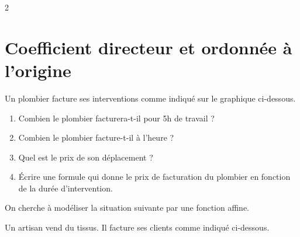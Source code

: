 \documentclass[10pt,a4paper]{article}
\begin{document}
\begin{multicols}{2}
\section{Coefficient directeur et ordonnée à l'origine}
\begin{exo}[][]
    Un plombier facture ses interventions comme indiqué sur le graphique ci-dessous.
    
    \begin{enumerate}
        \item Combien le plombier facturera-t-il pour 5h de travail ?
        \item Combien le plombier facture-t-il à l'heure ?
        \item Quel est le prix de son déplacement ?
        \item Écrire une formule qui donne le prix de facturation du plombier en fonction de la durée d'intervention.
    \end{enumerate}
\end{exo}

\begin{exo}[][]
    On cherche à modéliser la situation suivante par une fonction affine.

    Un artisan vend du tissus. Il facture ses clients comme indiqué ci-dessous.


\end{exo}
\end{multicols}
\end{document}

